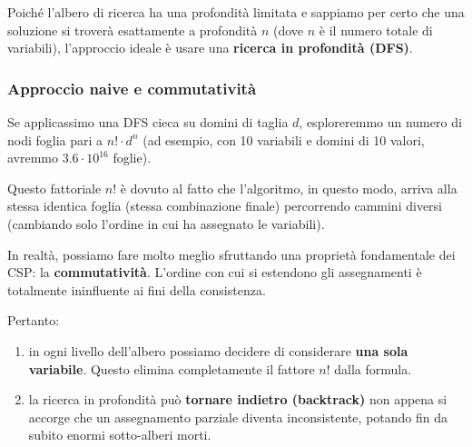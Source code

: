 \documentclass[a4paper,11pt]{report}
\begin{document}
Poiché l'albero di ricerca ha una profondità limitata e sappiamo per certo che una soluzione si troverà esattamente a profondità $n$ (dove $n$ è il numero totale di variabili), l'approccio ideale è usare una \textbf{ricerca in profondità (DFS)}.

\subsubsection{Approccio naive e commutatività}
Se applicassimo una DFS cieca su domini di taglia $d$, esploreremmo un numero di nodi foglia pari a $n! \cdot d^n$ (ad esempio, con 10 variabili e domini di 10 valori, avremmo $3.6 \cdot 10^{16}$ foglie). 

Questo fattoriale $n!$ è dovuto al fatto che l'algoritmo, in questo modo, arriva alla stessa identica foglia (stessa combinazione finale) percorrendo cammini diversi (cambiando solo l'ordine in cui ha assegnato le variabili).

In realtà, possiamo fare molto meglio sfruttando una proprietà fondamentale dei CSP: la \textbf{commutatività}.
L'ordine con cui si estendono gli assegnamenti è totalmente ininfluente ai fini della consistenza.

Pertanto:
\begin{enumerate}
    \item in ogni livello dell'albero possiamo decidere di considerare \textbf{una sola variabile}. Questo elimina completamente il fattore $n!$ dalla formula.
    \item la ricerca in profondità può \textbf{tornare indietro (backtrack)} non appena si accorge che un assegnamento parziale diventa inconsistente, potando fin da subito enormi sotto-alberi morti.
\end{enumerate}
\end{document}
